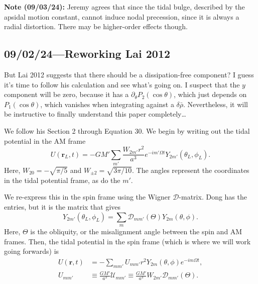 \documentclass[12pt]{article}
\newcommand*{\bm}[1]{\boldsymbol{\mathbf{#1}}}
\newcommand*{\p}[1]{\left(#1\right)}
\begin{document}
\textbf{Note (09/03/24):} Jeremy agrees that since the tidal bulge, described by
the apsidal motion constant, cannot induce nodal precession, since it is always
a radial distortion. There may be higher-order effects though.

\subsection{09/02/24---Reworking Lai 2012}

But Lai 2012 suggests that there should be a dissipation-free component? I guess
it's time to follow his calculation and see what's going on. I suspect that the
$y$ component will be zero, because it has a $\partial_\theta P_2(\cos\theta)$,
which just depends on $P_1(\cos\theta)$, which vanishes when integrating against
a $\delta \bar{\rho}$. Nevertheless, it will be instructive to finally
understand this paper completely\dots

We follow his Section 2 through Equation 30. We begin by writing out the tidal
potential in the AM frame
\begin{equation}
    U\p{\bm{r}_L, t} = -GM'
        \sum\limits_{m'} \frac{W_{2m'}r^2}{a^3}
            e^{-im' \Omega t}Y_{2m'}\p{\theta_L, \phi_L}.
\end{equation}
Here, $W_{20} = -\sqrt{\pi/5}$ and $W_{\pm 2} = \sqrt{3\pi / 10}$. The angles
represent the coordinates in the tidal potential frame, as do the $m'$.

We re-express this in the spin frame using the Wigner $\mathcal{D}$-matrix. Dong
has the entries, but it is the matrix that gives
\begin{equation}
    Y_{2m'}\p{\theta_L, \phi_L}
        = \sum\limits_m \mathcal{D}_{mm'}(\Theta)Y_{2m}\p{\theta, \phi}.
\end{equation}
Here, $\Theta$ is the obliquity, or the misalignment angle between the spin and
AM frames. Then, the tidal potential in the spin frame (which is where we will
work going forwards) is
\begin{align}
    U\p{\bm{r}, t}
        &= -\sum\limits_{mm'} U_{mm'} r^2Y_{2m}\p{\theta, \phi}
            e^{-im \Omega t},\\
    U_{mm'}
        &\equiv \frac{GM'}{a^3}\mathcal{U}_{mm'}
        \equiv \frac{GM'}{a^3}W_{2m'}\mathcal{D}_{mm'}(\Theta).
\end{align}
\end{document}
